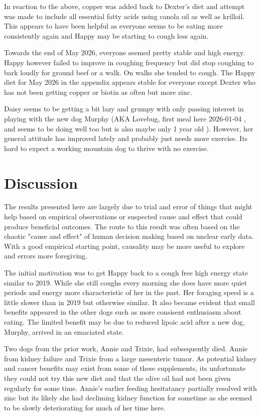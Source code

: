 In reaction to the above, copper was added back to Dexter's
diet and attempt was made to include all essential 
fatty acids using canola oil as well as krilloil.
This appears to have been helpful as everyone seems to be
eating more consistently again and Happy may be starting
to cough less again. 

Towards the end of May 2026, everyone seemed pretty stable
and high energy. Happy however failed to improve in coughing
frequency but did stop coughing to bark loudly for ground beef or a
walk.  On walks she tended to cough. The Happy diet for May 2026
in the appendix appears stable for everyone except Dexter who has
not been getting copper or biotin as often but more  zinc.

Daisy seems to be getting a bit lazy and grumpy with only
passing interest in playing with the new dog Murphy (AKA 
Lovebug, first meal here 2026-01-04 , and seems to be doing well
too but is also maybe only 1 year old ). However, her general
attitude has improved lately and probably just needs more exercise.
Its hard to expect a working mountain dog to thrive with no exercise. 



\section{Discussion}
The results presented here are largely due to trial and error
of things that might help based on empirical observations
or suspected cause and effect that could produce beneficial outcomes.
The route to this result was often based on the chaotic "cause and
effect" of human decision making based on unclear early data.
With a good empirical starting point, causality may
be more useful to explore and errors more foregiving.

The initial motivation was to get Happy back to a cough free high
energy state similar to 2019. 
While she still coughs every morning she does have more quiet periods
and energy more characteristic of her in the past. Her foraging speed
is a little slower than in 2019 but otherwise similar. 
It also became evident that  small
benefits appeared in the other dogs such as more consisent enthusiasm
about eating. The limited benefit may be due to reduced lipoic acid
after a new dog, Murphy, arrived in an emaciated state.  

Two dogs from the prior work, Annie and Trixie, had subsequently
died. Annie from kidney failure and Trixie from a large mesenteric 
tumor. As potential kidney and cancer benefits may exist from
some of these supplements, its unfortunate they could not try this
new diet and that the olive oil had not been given regularly for
some time.
Annie's earlier feeding hesitatancy partially resolved with zinc  but
its likely she had decliming kidney function for sometime as
she seemed to be slowly deteriorating for much of her time here. 

